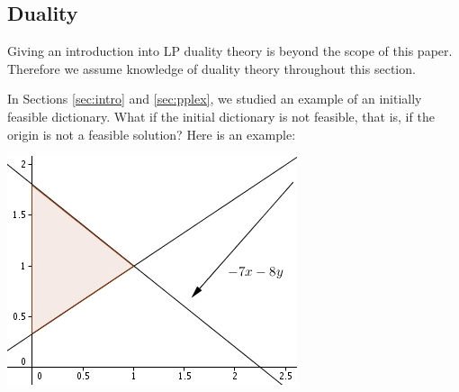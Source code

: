 \documentclass[ukenglish,a4]{article}
\begin{document}
\subsection{Duality}

Giving an introduction into LP duality theory is beyond the scope of this paper. 
Therefore we assume knowledge of duality theory throughout this section.

In Sections \ref{sec:intro} and \ref{sec:pplex}, we studied an example of an initially feasible dictionary.
What if the initial dictionary is not feasible, that is, if the origin is not a
feasible solution? Here is an example:

\begin{minipage}{.45\textwidth}
\begin{alltt}

\end{alltt}
\end{minipage}
\begin{minipage}{.45\textwidth}
	\includegraphics{ex_dual.jpg}
\end{minipage}
\vspace{.2cm}
\end{document}
